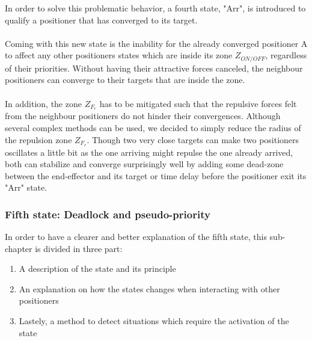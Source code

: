 \documentclass[]{spie}  %
\begin{document}
	In order to solve this problematic behavior, a fourth state, "Arr", is introduced to qualify a positioner that has converged to its target. \\\\
	Coming with this new state is the inability for the already converged positioner A to affect any other positioners states which are inside its zone $Z_{ON/OFF}$, regardless of their priorities.
	Without having their attractive forces canceled, the neighbour positioners can converge to their targets that are inside the zone.\\\\
	In addition, the zone $Z_{F_{r}}$ has to be mitigated such that the repulsive forces felt from the neighbour positioners do not hinder their convergences. Although several complex methods can be used, we decided to simply reduce the radius of the repulsion zone $Z_{F_{r}}$. Though two very close targets can make two positioners oscillates a little bit as the one arriving might repulse the one already arrived, both can stabilize and converge surprisingly well by adding some dead-zone between the end-effector and its target or time delay before the positioner exit its "Arr" state.  
	
	\subsubsection{Fifth state: Deadlock and pseudo-priority}
	\label{sub_chapter_fifth_state}
	In order to have a clearer and better explanation of the fifth state, this sub-chapter is divided in three part: 
	\begin{enumerate}
		\item A description of the state and its principle 
		\item An explanation on how the states changes when interacting with other positioners
		\item Lastely, a method to detect situations which require the activation of the state
	\end{enumerate}
	
\end{document}
